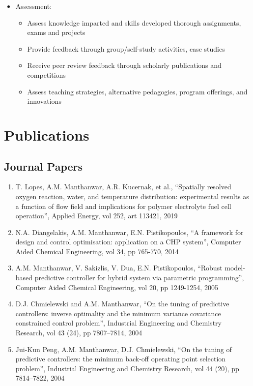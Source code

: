 \documentclass[10pt]{article}
\newcommand{\etal}{et al.}
\begin{document}
\begin{itemize}
\item Assessment:
\begin{itemize}[nosep]
\item Assess knowledge imparted and skills developed thorough assignments, exams and  projects
\item Provide feedback through group/self-study activities, case studies
\item Receive peer review feedback through scholarly publications and competitions
\item Assess teaching strategies, alternative pedagogies, program offerings, and innovations
\end{itemize}
\end{itemize}



\section{Publications}
\subsection{Journal Papers}
\begin{enumerate}[nosep]
\item T. Lopes,  A.M. Manthanwar, A.R. Kucernak, \etal, ``Spatially resolved oxygen reaction, water, and temperature distribution: experimental results as a function of flow field and implications for polymer electrolyte fuel cell operation'', Applied Energy, vol 252, art 113421, 2019


\item N.A. Diangelakis, A.M. Manthanwar, E.N. Pistikopoulos, ``A framework for design and control optimisation: application on a CHP system'', Computer Aided Chemical Engineering, vol 34, pp 765-770, 2014

\item A.M. Manthanwar, V. Sakizlis, V. Dua, E.N. Pistikopoulos, ``Robust model-based predictive controller for hybrid system via parametric programming'', Computer Aided Chemical Engineering, vol 20, pp 1249-1254, 2005

\item D.J. Chmielewski and A.M. Manthanwar, ``On the tuning of predictive controllers: inverse optimality and the minimum variance covariance constrained control problem'', Industrial Engineering and Chemistry Research, vol 43 (24), pp 7807--7814, 2004

\item Jui-Kun Peng, A.M. Manthanwar, D.J. Chmielewski, ``On the tuning of predictive controllers: the minimum back-off operating point selection problem'', Industrial Engineering and Chemistry Research, vol 44 (20), pp 7814--7822, 2004

\end{enumerate}
\end{document}
